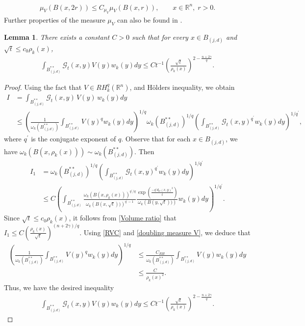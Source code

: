 \documentclass[11pt, reqno]{amsproc}
\newtheorem{lemma}[theorem]{Lemma}
\theoremstyle{definition}
\theoremstyle{remark}
\numberwithin{equation}{section}
\begin{document}
\begin{align}\label{doubling measure V}
\mu_V(B(x,2r))
\leq
C_{\mu_V}\mu_V(B(x,r)),
\qquad x\in\mathbb{R}^n,\; r>0.
\end{align}
Further properties of the measure $\mu_V$ can also be found in \cite{Hejna-2021}.
\begin{lemma}
There exists a constant $C>0$ such that for every $x\in B_{(j,d)}$ and 
$\sqrt{t}\leq c_0 \rho_k(x)$,
\begin{align}\label{assumption-2}
\int_{B_{(j,d)}^{**}} \mathcal{G}_{t}(x,y)V(y)w_k(y)dy
\leq
Ct^{-1}
\left(\frac{\sqrt{t}}{\rho_k(x)}\right)^{2-\frac{n+2\gamma}{q}} .
\end{align}
\end{lemma}
\begin{proof}
Using the fact that $V\in RH_k^q(\mathbb{R}^n)$, and H\"olders inequality, we obtain 
\begin{align*}
   I&=\int_{B_{(j,d)}^{**}} \mathcal{G}_{t}(x,y)\,V(y)\,w_k(y)dy \\
    & \leq \left( \frac{1}{\omega_k\left( B_{(j,d)}^{**}\right)} \int_{B_{(j,d)}^{**}}V(y)^qw_k(y)dy  \right)^{1/q} \omega_k\left( B_{(j,d)}^{**}\right)^{1/q} \left(\int_{B_{(j,d)}^{**}} \mathcal{G}_{t}(x,y)^{q^\prime}w_k(y)dy\right)^{1/q^{\prime}},
\end{align*} where $q^\prime$ is the conjugate exponent of $q$. Observe that for each $x\in B_{(j,d)}$, we have $\omega_k(B(x,\rho_k(x)))\sim \omega_k\left( B_{(j,d)}^{**} \right)$. Then 
\begin{align*}
   I_1 &= \omega_k\left( B_{(j,d)}^{**}\right)^{1/q}\left(\int_{B_{(j,d)}^{**}} \mathcal{G}_{t}(x,y)^{q^\prime}w_k(y)dy\right)^{1/q^{\prime}}
    \\ & \leq C  \left(\int_{B_{(j,d)}^{**}} 
    \frac{\omega_k \left( B(x, \rho_k(x)) \right)^{q^\prime/q}}{ \omega_k \left( B(x, \sqrt{t})) \right)^{q^\prime-1}} \frac{ \exp \left( \frac{-q^\prime d_{\mathcal{O}}(x,y)^2}{t} \right) }{ \omega_k \left( B(y, \sqrt{t})) \right) }
    w_k(y)dy\right)^{1/q^{\prime}}.
\end{align*}
Since $\sqrt{t} \leq c_0\rho_k(x)$, it follows from \eqref{Volume ratio} that $I_1 \leq C \left( \frac{\rho_k(x)}{\sqrt{t}} \right)^{(n+2\gamma)/q}$. Using \eqref{RVC} and \eqref{doubling measure V}, we deduce that  
\begin{align*}
    \left( \frac{1}{\omega_k\left( B_{(j,d)}^{**}\right)} \int_{B_{(j,d)}^{**}}V(y)^qw_k(y)dy  \right)^{1/q}  & \leq  \frac{C_{RH}}{\omega_k\left( B_{(j,d)}^{**}\right)} \int_{B_{(j,d)}^{**}}V(y)w_k(y)dy  \\
   & \leq \frac{C}{\rho_k(x)^2}.
\end{align*} Thus, we have the desired inequality
\begin{align*}
    \int_{B_{(j,d)}^{**}} \mathcal{G}_{t}(x,y)V(y)w_k(y)dy
\leq
Ct^{-1}
\left(\frac{\sqrt{t}}{\rho_k(x)}\right)^{2-\frac{n+2\gamma}{q}} .
\end{align*}
\end{proof}
\end{document}
